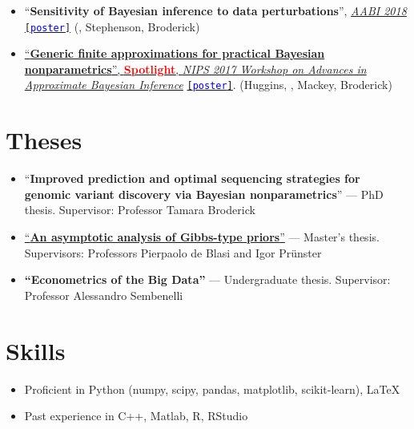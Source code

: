 \documentclass[10pt, a4paper]{article}
\newcommand{\years}[1]{\marginnote{\scriptsize #1}}
\begin{document}
\begin{itemize}
 	\item ``\textbf{Sensitivity of Bayesian inference to data perturbations}'', \href{http://approximateinference.org/accepted/}{\emph{AABI 2018}} \href{https://lorenzomasoero.com/files/aabi_2018_poster.pdf}{\texttt{[\textcolor{blue}{poster}]}} (\mm, Stephenson, Broderick)
\item \href{http://www.approximateinference.org/2017/accepted/HugginsEtAl2017.pdf}{``\textbf{Generic finite approximations
for practical Bayesian nonparametrics}'', \textcolor{red}{\textbf{Spotlight}}, \emph{NIPS 2017 Workshop on Advances in Approximate Bayesian Inference}} \href{https://lorenzomasoero.com/files/aabi_2017_poster.pdf}{\texttt{[\textcolor{blue}{poster}]}}.  (Huggins, \mm, Mackey, Broderick)
\end{itemize}
\section*{Theses}
\begin{itemize}
\item ``\textbf{Improved prediction and optimal sequencing strategies for genomic variant discovery via Bayesian nonparametrics}'' --- PhD thesis. Supervisor: Professor Tamara Broderick
\item \href{http://www.mit.edu/~lom/files/MasterThesisShort.pdf}{``\textbf{An asymptotic analysis of Gibbs-type priors}''} --- Master's thesis. Supervisors: Professors Pierpaolo de Blasi and Igor Pr\"{u}nster 
\item \textbf{``Econometrics of the Big Data''} --- Undergraduate thesis. Supervisor: Professor Alessandro Sembenelli
\end{itemize}
\newpage 
\section*{Skills}
\begin{itemize}
	\item Proficient in Python (numpy, scipy, pandas, matplotlib, scikit-learn), \LaTeX
	\item Past experience in C++, Matlab, R, RStudio
\end{itemize}
\end{document}
